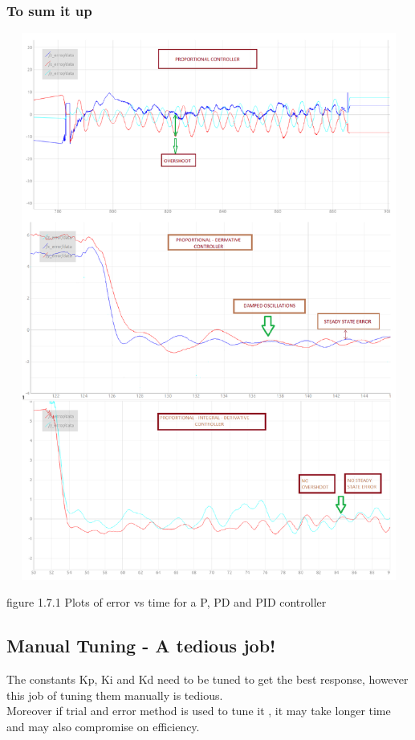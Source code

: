 \documentclass[a4paper,12pt,oneside]{book}
\begin{document}
\subsubsection{To sum it up}
\begin{flushleft}
\includegraphics[width = 15cm , height= 18cm]{ALL_PID1.png}
\end{flushleft}
\begin{center}
    figure 1.7.1 Plots of error vs time for a P, PD and PID controller
\end{center}

\subsection{Manual Tuning - A tedious job!}
The constants Kp, Ki and Kd need to be tuned to get the best response, however this job of tuning them manually is tedious.\\
Moreover if trial and error method is used to tune it , it may take longer time and may also compromise on efficiency.
\end{document}
